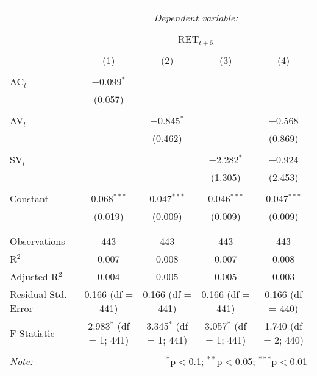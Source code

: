 
\begin{table}[!htbp] \centering 
  \caption{} 
  \label{} 
\begin{tabular}{@{\extracolsep{5pt}}lcccc} 
\\[-1.8ex]\hline 
\hline \\[-1.8ex] 
 & \multicolumn{4}{c}{\textit{Dependent variable:}} \\ 
\cline{2-5} 
\\[-1.8ex] & \multicolumn{4}{c}{RET$_{t+6}$} \\ 
\\[-1.8ex] & (1) & (2) & (3) & (4)\\ 
\hline \\[-1.8ex] 
 AC$_{t}$ & $-$0.099$^{*}$ &  &  &  \\ 
  & (0.057) &  &  &  \\ 
  & & & & \\ 
 AV$_{t}$ &  & $-$0.845$^{*}$ &  & $-$0.568 \\ 
  &  & (0.462) &  & (0.869) \\ 
  & & & & \\ 
 SV$_{t}$ &  &  & $-$2.282$^{*}$ & $-$0.924 \\ 
  &  &  & (1.305) & (2.453) \\ 
  & & & & \\ 
 Constant & 0.068$^{***}$ & 0.047$^{***}$ & 0.046$^{***}$ & 0.047$^{***}$ \\ 
  & (0.019) & (0.009) & (0.009) & (0.009) \\ 
  & & & & \\ 
\hline \\[-1.8ex] 
Observations & 443 & 443 & 443 & 443 \\ 
R$^{2}$ & 0.007 & 0.008 & 0.007 & 0.008 \\ 
Adjusted R$^{2}$ & 0.004 & 0.005 & 0.005 & 0.003 \\ 
Residual Std. Error & 0.166 (df = 441) & 0.166 (df = 441) & 0.166 (df = 441) & 0.166 (df = 440) \\ 
F Statistic & 2.983$^{*}$ (df = 1; 441) & 3.345$^{*}$ (df = 1; 441) & 3.057$^{*}$ (df = 1; 441) & 1.740 (df = 2; 440) \\ 
\hline 
\hline \\[-1.8ex] 
\textit{Note:}  & \multicolumn{4}{r}{$^{*}$p$<$0.1; $^{**}$p$<$0.05; $^{***}$p$<$0.01} \\ 
\end{tabular} 
\end{table} 
